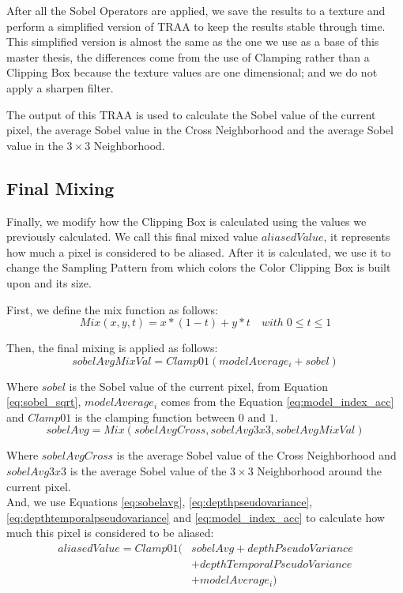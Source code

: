 \documentclass{cslthse-msc}
\begin{document}
After all the Sobel Operators are applied, we save the results to a texture and perform a simplified version of TRAA to keep the results stable through time. This simplified version is almost the same as the one we use as a base of this master thesis, the differences come from the use of Clamping rather than a Clipping Box because the texture values are one dimensional; and we do not apply a sharpen filter.

The output of this TRAA is used to calculate the Sobel value of the current pixel, the average Sobel value in the Cross Neighborhood and the average Sobel value in the $3\times 3$ Neighborhood.

\subsection{Final Mixing}
Finally, we modify how the Clipping Box is calculated using the values we previously calculated. We call this final mixed value $aliasedValue$, it represents how much a pixel is considered to be aliased. After it is calculated, we use it to change the Sampling Pattern from which colors the Color Clipping Box is built upon and its size.

First, we define the mix function as follows:
\begin{equation} \label{eq:mixfunction}
Mix(x,y,t)=x*(1-t)+y*t\quad with\; 0\leq t\leq 1
\end{equation} 

Then, the final mixing is applied as follows:
\begin{equation}\label{eq:sobelavgmixval}
sobelAvgMixVal=Clamp01(modelAverage_i+sobel) 
\end{equation}
 
Where $sobel$ is the Sobel value of the current pixel, from Equation \ref{eq:sobel_sqrt}, $modelAverage_i$ comes from the Equation \ref{eq:model_index_acc} and $Clamp01$ is the clamping function between $0$ and $1$. \\

\begin{equation}\label{eq:sobelavg}
sobelAvg=Mix(sobelAvgCross, sobelAvg3x3, sobelAvgMixVal)
\end{equation}

Where $sobelAvgCross$ is the average Sobel value of the Cross Neighborhood and $sobelAvg3x3$ is the average Sobel value of the $3\times 3$ Neighborhood around the current pixel. \\ 

And, we use Equations \ref{eq:sobelavg}, \ref{eq:depthpseudovariance}, \ref{eq:depthtemporalpseudovariance} and \ref{eq:model_index_acc} to calculate how much this pixel is considered to be aliased:
\begin{equation}\label{eq:aliasedvalue}
\begin{split}
aliasedValue=Clamp01 (& sobelAvg + depthPseudoVariance \\
 & + depthTemporalPseudoVariance \\
 & + modelAverage_i)
\end{split}
\end{equation}
\end{document}
